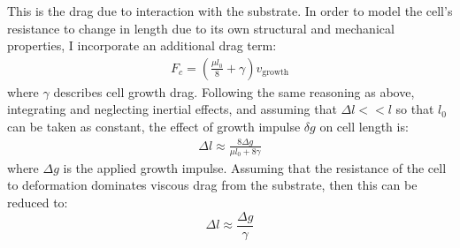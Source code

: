 \documentclass{report}
\begin{document}
\begin{appendices}
This is the drag due to interaction with the substrate. In order to
model the cell's resistance to change in length due to its own structural and
mechanical properties, I incorporate an additional
drag term:
\begin{align*}
    F_c = \left( \frac{\mu l_0}{8} + \gamma \right) v_\textrm{growth}
\end{align*}
where $\gamma$ describes cell growth drag. Following the same
reasoning as above, integrating and neglecting inertial effects, and assuming
that $\Delta l << l$ so that $l_0$ can be taken as constant, the effect of
growth impulse $\delta g$ on cell length is:
\begin{align*}
    \Delta l \approx \frac{8 \Delta g}{\mu l_0 + 8 \gamma}
\end{align*}
where $\Delta g$ is the applied growth impulse. Assuming that the resistance of
the cell to deformation dominates viscous drag from the substrate, then
this can be reduced to:
\begin{equation}
    \Delta l \approx \frac{\Delta g}{\gamma}
    \label{eqn:deltal}
\end{equation}


\end{appendices}
\end{document}

